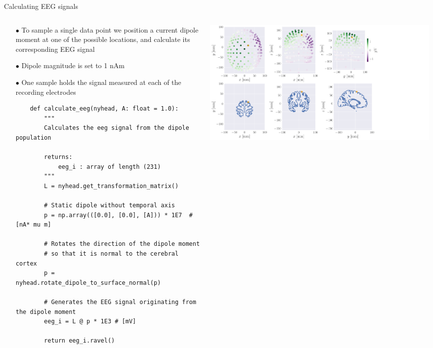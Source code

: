 \documentclass[aspectratio=169, 9pt]{beamer}
\begin{document}
\begin{frame}[fragile]{Calculating EEG signals}
    \begin{columns}
        \begin{column}{0.5\textwidth}
            \begin{itemize}
                \item[$\bullet$] To sample a single data point we position a current dipole moment at one of the possible locations, and calculate its corresponding EEG signal
                \item[$\bullet$] Dipole magnitude is set to 1 nAm
                \item[$\bullet$] One sample holds the signal measured at each of the recording electrodes
                {\scriptsize
                \begin{verbatim}
    def calculate_eeg(nyhead, A: float = 1.0):
        """
        Calculates the eeg signal from the dipole population

        returns:
            eeg_i : array of length (231)
        """
        L = nyhead.get_transformation_matrix()

        # Static dipole without temporal axis
        p = np.array(([0.0], [0.0], [A])) * 1E7  # [nA* mu m]

        # Rotates the direction of the dipole moment
        # so that it is normal to the cerebral cortex
        p = nyhead.rotate_dipole_to_surface_normal(p)

        # Generates the EEG signal originating from the dipole moment
        eeg_i = L @ p * 1E3 # [mV]

        return eeg_i.ravel()
                \end{verbatim}
                }
            \end{itemize}
        \end{column}
        \begin{column}{0.5\textwidth}
          \includegraphics[width=1.0\textwidth]{figures/simple_example.pdf}
        \end{column}
    \end{columns}
\end{frame}
\end{document}
